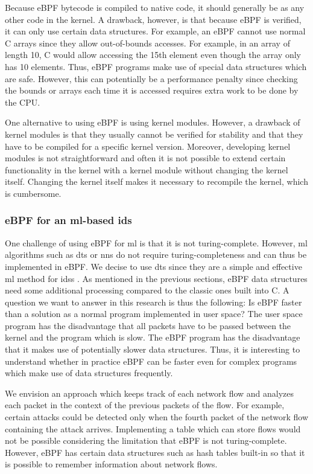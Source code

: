 \documentclass[conference]{IEEEtran}
\begin{document}
Because eBPF bytecode is compiled to native code, it should generally be as any other code in the kernel. A drawback, however, is that because eBPF is verified, it can only use certain data structures. For example, an eBPF cannot use normal C arrays since they allow out-of-bounds accesses. For example, in an array of length 10, C would allow accessing the 15th element even though the array only has 10 elements. Thus, eBPF programs make use of special data structures which are safe. However, this can potentially be a performance penalty since checking the bounds or arrays each time it is accessed requires extra work to be done by the CPU. 

One alternative to using eBPF is using kernel modules. However, a drawback of kernel modules is that they usually cannot be verified for stability and that they have to be compiled for a specific kernel version. Moreover, developing kernel modules is not straightforward and often it is not possible to extend certain functionality in the kernel with a kernel module without changing the kernel itself. Changing the kernel itself makes it necessary to recompile the kernel, which is cumbersome. 

\subsubsection{eBPF for an \gls{ml}-based \gls{ids}}

One challenge of using eBPF for \gls{ml} is that it is not turing-complete. However, \gls{ml} algorithms such as \glspl{dt} or \glspl{nn} do not require turing-completeness and can thus be implemented in eBPF. We decise to use \glspl{dt} since they are a simple and effective \gls{ml} method for \glspl{ids} \cite{iglesias_ntarc_2020}. As mentioned in the previous sections, eBPF data structures need some additional processing compared to the classic ones built into C. A question we want to answer in this research is thus the following: Is eBPF faster than a solution as a normal program implemented in user space? The user space program has the disadvantage that all packets have to be passed between the kernel and the program which is slow. The eBPF program has the disadvantage that it makes use of potentially slower data structures. Thus, it is interesting to understand whether in practice eBPF can be faster even for complex programs which make use of data structures frequently. 

We envision an approach which keeps track of each network flow and analyzes each packet in the context of the previous packets of the flow. For example, certain attacks could be detected only when the fourth packet of the network flow containing the attack arrives. Implementing a table which can store flows would not be possible considering the limitation that eBPF is not turing-complete. However, eBPF has certain data structures such as hash tables built-in so that it is possible to remember information about network flows. 

\section{}


\renewcommand*{\bibfont}{\small}


\end{document}
